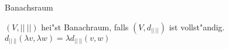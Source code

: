 \documentclass[class=article, crop=false]{standalone}
\begin{document}
\begin{zettel}{Banachsraum}
\begin{flashcard}
    \begin{definition}[Banachsraum]
        $ (V, ||\ ||)  $ hei"st Banachraum, falls $ (V,d_{||\ ||})  $ ist vollst"andig.
        $d_{ ||\ ||}(\lambda v, \lambda w) = \lambda  d_{ ||\ ||} (v,w) $
    \end{definition}
\end{flashcard}
\end{zettel}
\end{document}
